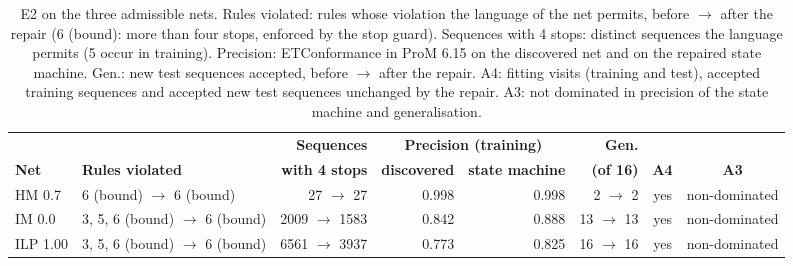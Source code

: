 \begin{table}[htbp]
\centering
\footnotesize
\setlength{\tabcolsep}{3pt}
\begin{tabular}{llrrrrcc}
\toprule
 & & \textbf{Sequences} & \multicolumn{2}{c}{\textbf{Precision (training)}} & \textbf{Gen.} & & \\
\textbf{Net} & \textbf{Rules violated} & \textbf{with 4 stops} & \textbf{discovered} & \textbf{state machine} & \textbf{(of 16)} & \textbf{A4} & \textbf{A3} \\
\midrule
HM 0.7 & 6 (bound) $\rightarrow$ 6 (bound) & 27 $\rightarrow$ 27 & 0.998 & 0.998 & 2 $\rightarrow$ 2 & yes & non-dominated \\
IM 0.0 & 3, 5, 6 (bound) $\rightarrow$ 6 (bound) & 2009 $\rightarrow$ 1583 & 0.842 & 0.888 & 13 $\rightarrow$ 13 & yes & non-dominated \\
ILP 1.00 & 3, 5, 6 (bound) $\rightarrow$ 6 (bound) & 6561 $\rightarrow$ 3937 & 0.773 & 0.825 & 16 $\rightarrow$ 16 & yes & non-dominated \\
\bottomrule
\end{tabular}
\caption{E2 on the three admissible nets. Rules violated: rules whose violation the language of the net permits, before $\rightarrow$ after the repair (6 (bound): more than four stops, enforced by the stop guard). Sequences with 4 stops: distinct sequences the language permits (5 occur in training). Precision: ETConformance in ProM 6.15 on the discovered net and on the repaired state machine. Gen.: new test sequences accepted, before $\rightarrow$ after the repair. A4: fitting visits (training and test), accepted training sequences and accepted new test sequences unchanged by the repair. A3: not dominated in precision of the state machine and generalisation.}
\label{tab:rq1_e2_funnel}
\end{table}
